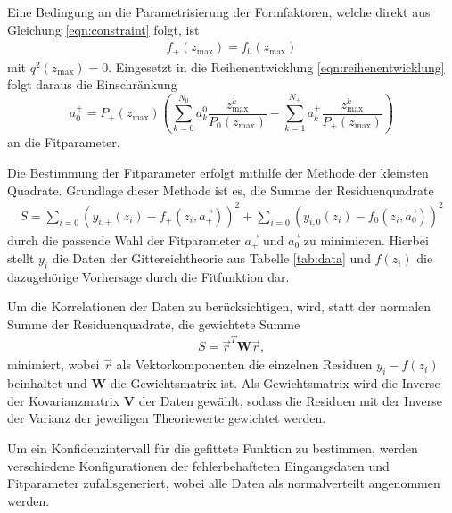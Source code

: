 Eine Bedingung an die Parametrisierung der Formfaktoren, welche direkt aus Gleichung \eqref{eqn:constraint} folgt, ist
\begin{align*}
  f_+(z_\text{max}) = f_0(z_\text{max})
\end{align*}
mit $q^2(z_\text{max}) = 0$.
Eingesetzt in die Reihenentwicklung \eqref{eqn:reihenentwicklung} folgt daraus die Einschränkung
\begin{equation}
  \label{eqn:einschr}
  a_0^+ = P_+(z_\text{max}) \left( \sum_{k=0}^{N_0} a_k^0 \frac{z_{\text{max}}^k}{P_0(z_\text{max})} - \sum_{k=1}^{N_+} a_k^+ \frac{z_{\text{max}}^k}{P_+(z_\text{max})} \right)
\end{equation}
an die Fitparameter.%

Die Bestimmung der Fitparameter erfolgt mithilfe der Methode der kleinsten Quadrate.
Grundlage dieser Methode ist es, die Summe der Residuenquadrate
\begin{align*}
  S = \sum_{i=0}^{} \left( y_{i,+}(z_i) - f_{+}(z_i, \vec{a_+}) \right)^2 + \sum_{i=0}^{} \left( y_{i,0}(z_i) - f_{0}(z_i, \vec{a_0}) \right)^2
\end{align*}
durch die passende Wahl der Fitparameter $\vec{a_+}$ und $\vec{a_0}$ zu minimieren.
Hierbei stellt $y_i$ die Daten der Gittereichtheorie aus Tabelle \ref{tab:data} und $f(z_i)$ die dazugehörige Vorhersage durch die Fitfunktion dar.

Um die Korrelationen der Daten zu berücksichtigen, wird, statt der normalen Summe der Residuenquadrate, die gewichtete Summe
\begin{align*}
  S = \vec{r}^T \symbf{W} \vec{r},
\end{align*}
minimiert, wobei $\vec{r}$ als Vektorkomponenten die einzelnen Residuen $y_i - f(z_i)$ beinhaltet und $\symbf{W}$ die Gewichtsmatrix ist.
Als Gewichtsmatrix wird die Inverse der Kovarianzmatrix $\symbf{V}$ der Daten gewählt, sodass die Residuen mit der Inverse der Varianz der jeweiligen Theoriewerte gewichtet werden.

Um ein Konfidenzintervall für die gefittete Funktion zu bestimmen, werden $$ verschiedene Konfigurationen der fehlerbehafteten Eingangsdaten und Fitparameter zufallsgeneriert, wobei alle Daten als normalverteilt angenommen werden.

